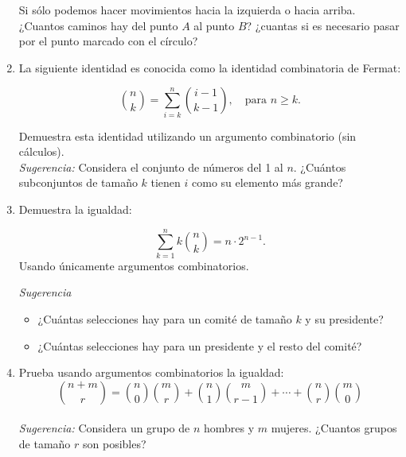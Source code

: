 \documentclass{article}
\begin{document}
\begin{enumerate}
\begin{center}
		
			
		\end{center}
		
			Si sólo podemos hacer movimientos hacia la izquierda o hacia arriba. ¿Cuantos caminos hay del punto $A$ al punto $B$? 			¿cuantas si es necesario pasar por el punto marcado con el círculo?
		\item La siguiente identidad es conocida como la identidad combinatoria de Fermat:

			\[
			\binom{n}{k} = \sum_{i=k}^{n} \binom{i-1}{k-1}, \quad \text{para } n \geq k.
			\]

	Demuestra esta identidad utilizando un argumento combinatorio (sin cálculos). \\
\textit{Sugerencia:} Considera el conjunto de números del 1 al \( n \). ¿Cuántos subconjuntos de tamaño \( k \) tienen \( i \) como su elemento más grande?

		\item Demuestra la igualdad:

\[
\sum_{k=1}^{n} k \binom{n}{k} = n \cdot 2^{n-1}.
\]
Usando únicamente argumentos combinatorios.

\textit{Sugerencia}

    \begin{itemize}
        \item ¿Cuántas selecciones hay para un comité de tamaño \( k \) y su presidente?
        \item ¿Cuántas selecciones hay para un presidente y el resto del comité?
    \end{itemize}
		
		\item Prueba usando argumentos combinatorios la igualdad:
		\[
		\binom{n+m}{r} = \binom{n}{0}\binom{m}{r} + \binom{n}{1}\binom{m}{r-1} + \cdots + \binom{n}{r}\binom{m}{0}
		\]\\
		\textit{Sugerencia:} Considera un grupo de $n$ hombres y $m$ mujeres. ¿Cuantos grupos de tamaño $r$ son posibles? 


\end{enumerate}
\end{document}
